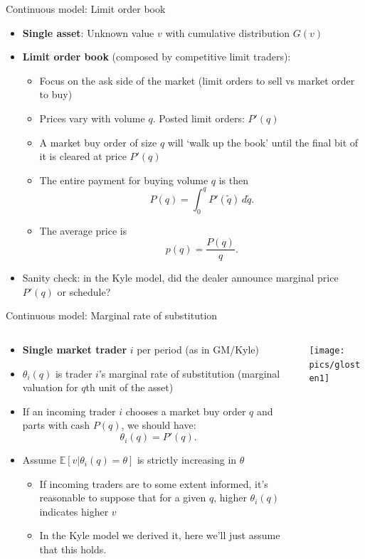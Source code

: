 \documentclass[english,10pt
,aspectratio=169
]{beamer}
\begin{document}
\begin{frame}{Continuous model: Limit order book}
\begin{itemize}
	\item \textbf{Single asset}: Unknown value $v$ with cumulative distribution  $G(v)$
	\item \textbf{Limit order book} (composed by competitive limit traders): 
	\begin{itemize}
		\item Focus on the ask side of the market (limit orders to sell vs market order to buy)
		\item Prices vary with volume $q$. Posted limit orders: $P'(q)$
		\item A market buy order of size $q$ will `walk up the book' until the final bit of it is cleared at price $P'(q)$
		\item The entire payment for buying volume $q$ is then
		\[
		P(q) = \int_0^q P'(\tilde{q}) \, d\tilde{q}.
		\]
		\item The average price is 
		\[
		p(q) = \frac{P(q)}{q}.
		\]
	\end{itemize}
	\pause
	\item Sanity check: in the Kyle model, did the dealer announce \alert{marginal price $P'(q)$} or  schedule?
\end{itemize}
\end{frame}


\begin{frame}{Continuous model: Marginal rate of substitution}
	\begin{columns}
		\begin{column}{0.7\linewidth}
			\begin{itemize}
				\item \textbf{Single market trader} $i$ per period (as in GM/Kyle)
				\item $\theta_i(q)$ is trader $i$'s marginal rate of substitution (marginal valuation for $q$th unit of the asset)
				\item If an incoming trader $i$ chooses a market buy order $q$ and parts with cash $P(q)$, we should have: \[\theta_i(q) = P'(q).\]
				\item Assume $\mathbb{E}[v|\theta_i(q) = \theta]$ is strictly increasing in $\theta$
				\begin{itemize}
					\item If incoming traders are to some extent informed, it's reasonable to suppose that for a given $q$, higher $\theta_i(q)$ indicates higher $v$
					\item In the Kyle model we derived it, here we'll just assume that this holds.
				\end{itemize}
			\end{itemize}
		\end{column}
		\begin{column}{0.3\linewidth}
			\texttt{[image: pics/glosten1]}
			\vspace{3em}
		\end{column}
	\end{columns}
\end{frame}
\end{document}
